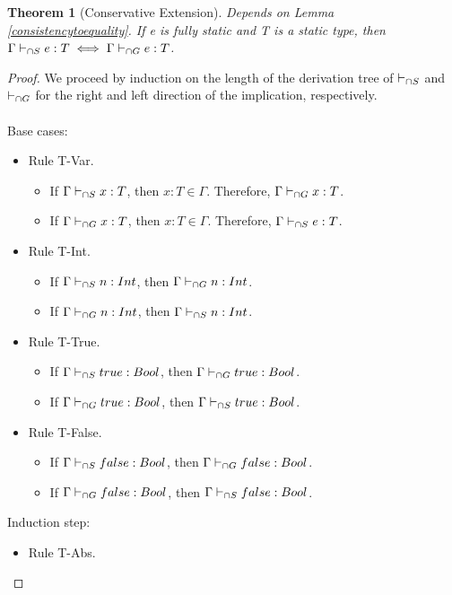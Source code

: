 \documentclass[a4paper]{article}
\newtheorem{theorem}{Theorem}[section]
\begin{document}
\begin{theorem}[Conservative Extension]
\label{conservative_extension_typesystem}
Depends on Lemma \ref{consistencytoequality}.
If e is fully static and T is a static type, then $\Gamma \vdash_{\cap S} e : T \iff \Gamma \vdash_{\cap G} e : T$.
\end{theorem}
\begin{proof}
We proceed by induction on the length of the derivation tree of $\vdash_{\cap S}$ and $\vdash_{\cap G}$ for the right and left direction of the implication, respectively.\\\\
Base cases:
\begin{itemize}
    \item Rule T-Var.
    \begin{itemize}
        \item If $\Gamma \vdash_{\cap S} x : T$, then $x : T \in \Gamma$.
        Therefore, $\Gamma \vdash_{\cap G} x : T$.
        \item If $\Gamma \vdash_{\cap G} x : T$, then $x : T \in \Gamma$.
        Therefore, $\Gamma \vdash_{\cap S} e : T$.
    \end{itemize}
    \item Rule T-Int.
    \begin{itemize}
        \item If $\Gamma \vdash_{\cap S} n : {Int}$, then $\Gamma \vdash_{\cap G} n : {Int}$.
        \item If $\Gamma \vdash_{\cap G} n : {Int}$, then $\Gamma \vdash_{\cap S} n : {Int}$.
    \end{itemize}
    \item Rule T-True.
    \begin{itemize}
        \item If $\Gamma \vdash_{\cap S} true : Bool$, then $\Gamma \vdash_{\cap G} true : Bool$.
        \item If $\Gamma \vdash_{\cap G} true : Bool$, then $\Gamma \vdash_{\cap S} true : Bool$.
    \end{itemize}
    \item Rule T-False.
    \begin{itemize}
        \item If $\Gamma \vdash_{\cap S} false : Bool$, then $\Gamma \vdash_{\cap G} false : Bool$.
        \item If $\Gamma \vdash_{\cap G} false : Bool$, then $\Gamma \vdash_{\cap S} false : Bool$.
    \end{itemize}
\end{itemize}
Induction step:
\begin{itemize}
    \item Rule T-Abs.
    \begin{itemize}

\end{itemize}
\end{itemize}
\end{proof}
\end{document}
